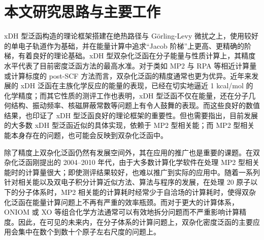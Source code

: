 \section{本文研究思路与主要工作}

xDH 型泛函构造的理论框架搭建在绝热路径与 G\"{o}rling-Levy 微扰之上，使用较好的单电子轨道作为基础，并在能量计算中追求“Jacob 阶梯”上更高、更精确的阶梯，有着良好的理论基础。xDH 型双杂化泛函在分子能量与性质计算上，其精度水平代表了目前密度泛函方法的最高水准。对于类如 MP2 与 RPA 等相近计算量或计算标度的 post-SCF 方法而言，双杂化泛函的精度通常也更为优异。近年来发展的 xDH 泛函在主族化学反应的能量的表现，已经在切实地逼近 1 kcal/mol 的化学精度；而其它性质的测评工作也表明，xDH 型泛函不仅在能量，还在分子几何结构、振动频率、核磁屏蔽常数等问题上有令人鼓舞的表现。而这些良好的数值结果，也印证了 xDH 型泛函良好的理论框架的重要性。但也需要指出，目前发展的大多数 xDH 型泛函近似的具体实现，依赖于 MP2 型相关能；而 MP2 型相关能本身存在的问题，也可能会反映到双杂化泛函中。

除了精度上双杂化泛函仍然有发展空间外，其在应用的推广也是重要的课题。在双杂化泛函刚提出的 2004--2010 年代，由于大多数计算化学软件在处理 MP2 型相关能时的计算量很大；即使测评结果较好，也难以推广到实际的应用中。随着一系列针对相关能以及双电子积分计算近似方法、算法与程序的发展，在处理 20 原子以下的分子体系时，MP2 相关能的计算耗时经常少于自洽场的计算耗时，使得双杂化泛函在能量计算问题上不再有严重的效率瓶颈。而对于更大的计算体系，ONIOM 或 XO 等组合化学方法通常可以有效地拆分问题而不严重影响计算精度\cite{Guo-Xu.JCC.2012, Chen-Xu.JCTC.2020, Chen-Xu.NC.2023}。因此，在可见的未来内，在分子体系的计算问题上，双杂化密度泛函的主要应用会集中在数个到数十个原子左右尺度的问题上。

